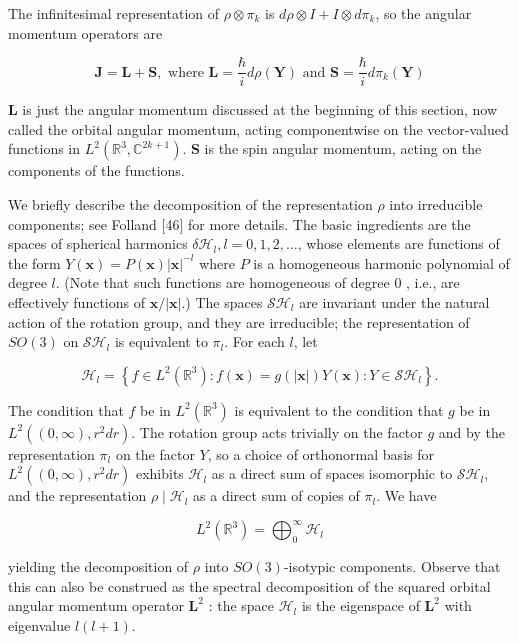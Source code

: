 \documentclass[10pt, letterpaper]{article}
\begin{document}
The infinitesimal representation of $\rho \otimes \pi_{k}$ is $d \rho \otimes I+I \otimes d \pi_{k}$, so the angular momentum operators are

$$
\mathbf{J}=\mathbf{L}+\mathbf{S}, \text { where } \mathbf{L}=\frac{\hbar}{i} d \rho(\mathbf{Y}) \text { and } \mathbf{S}=\frac{\hbar}{i} d \pi_{k}(\mathbf{Y})
$$

$\mathbf{L}$ is just the angular momentum discussed at the beginning of this section, now called the orbital angular momentum, acting componentwise on the vector-valued functions in $L^{2}\left(\mathbb{R}^{3}, \mathbb{C}^{2 k+1}\right)$. $\mathbf{S}$ is the spin angular momentum, acting on the components of the functions.

We briefly describe the decomposition of the representation $\rho$ into irreducible components; see Folland [46] for more details. The basic ingredients are the spaces of spherical harmonics $\delta \mathcal{H}_{l}, l=0,1,2, \ldots$, whose elements are functions of the form $Y(\mathbf{x})=P(\mathbf{x})|\mathbf{x}|^{-l}$ where $P$ is a homogeneous harmonic polynomial of degree $l$. (Note that such functions are homogeneous of degree 0 , i.e., are effectively functions of $\mathbf{x} /|\mathbf{x}|$.) The spaces $\mathcal{S} \mathcal{H}_{l}$ are invariant under the natural action of the rotation group, and they are irreducible; the representation of $S O(3)$ on $\mathcal{S} \mathcal{H}_{l}$ is equivalent to $\pi_{l}$. For each $l$, let

$$
\mathcal{H}_{l}=\left\{f \in L^{2}\left(\mathbb{R}^{3}\right): f(\mathbf{x})=g(|\mathbf{x}|) Y(\mathbf{x}): Y \in \mathcal{S} \mathcal{H}_{l}\right\} .
$$

The condition that $f$ be in $L^{2}\left(\mathbb{R}^{3}\right)$ is equivalent to the condition that $g$ be in $L^{2}\left((0, \infty), r^{2} d r\right)$. The rotation group acts trivially on the factor $g$ and by the representation $\pi_{l}$ on the factor $Y$, so a choice of orthonormal basis for $L^{2}\left((0, \infty), r^{2} d r\right)$ exhibits $\mathcal{H}_{l}$ as a direct sum of spaces isomorphic to $\mathcal{S} \mathcal{H}_{l}$, and the representation $\rho \mid \mathcal{H}_{l}$ as a direct sum of copies of $\pi_{l}$. We have

$$
L^{2}\left(\mathbb{R}^{3}\right)=\bigoplus_{0}^{\infty} \mathcal{H}_{l}
$$

yielding the decomposition of $\rho$ into $S O(3)$-isotypic components. Observe that this can also be construed as the spectral decomposition of the squared orbital angular momentum operator $\mathbf{L}^{2}$ : the space $\mathcal{H}_{l}$ is the eigenspace of $\mathbf{L}^{2}$ with eigenvalue $l(l+1)$.
\end{document}
